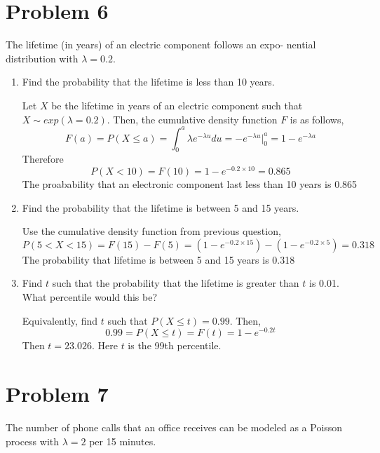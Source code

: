 \documentclass[11pt]{article}
\begin{document}
\pagebreak

\section*{Problem 6}
The lifetime (in years) of an electric component follows an expo- nential distribution with $\lambda = 0.2$.

\begin{enumerate}
  \item Find the probability that the lifetime is less than 10 years.
  \begin{solution}
    $ $\\
    Let $X$ be the lifetime in years of an electric component such that $X\sim exp(\lambda = 0.2)$. Then, the cumulative density function $F$ is as follows,
    \[
      F(a) = P(X\leq a) =\int_0^a \lambda e^{-\lambda u}du = -e^{-\lambda u}\Big\vert_0^{a} = 1 - e^{-\lambda a}
    \]
    Therefore
    \[
      P(X<10) = F(10) = 1-e^{-0.2 \times 10} = 0.865
    \]
    The proabability that an electronic component last less than 10 years is 0.865
  \end{solution}

  \item Find the probability that the lifetime is between 5 and 15 years.
  \begin{solution}
    $ $\\
    Use the cumulative density function from previous question,
    \[
      P(5<X<15) = F(15) - F(5) = (1-e^{-0.2 \times 15}) - (1-e^{-0.2 \times 5}) = 0.318
    \]
    The probability that lifetime is between 5 and 15 years is 0.318
  \end{solution}
  \item Find $t$ such that the probability that the lifetime is greater than $t$ is 0.01. What percentile would this be?
  \begin{solution}
    $ $\\
    Equivalently, find $t$ such that $P(X\leq t) = 0.99$. Then,
    \[
      0.99 = P(X\leq t) = F(t) = 1 - e^{-0.2t}
    \]
    Then $t=23.026$. Here $t$ is the 99th percentile.

  \end{solution}
\end{enumerate}


\section*{Problem 7}
The number of phone calls that an office receives can be modeled as a Poisson process with $\lambda = 2$ per 15 minutes.
\end{document}
